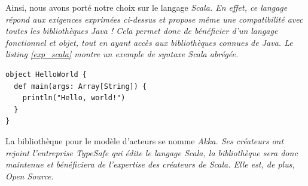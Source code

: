 Ainsi, nous avons porté notre choix sur le langage \em{Scala}. En effet, ce langage répond aux exigences exprimées ci-dessus et propose même une compatibilité avec toutes les bibliothèques Java ! Cela permet donc de bénéficier d'un langage fonctionnel et objet, tout en ayant accès aux bibliothèques connues de Java. Le listing \ref{exp_scala} montre un exemple de syntaxe Scala abrégée.

\begin{lstlisting}[caption={Exemple de code Scala},label=exp_scala]
object HelloWorld {
  def main(args: Array[String]) {
    println("Hello, world!")
  }
}
\end{lstlisting}

La bibliothèque pour le modèle d'acteurs se nomme \em{Akka}. Ses créateurs ont rejoint l'entreprise TypeSafe qui édite le langage Scala, la bibliothèque sera donc maintenue et bénéficiera de l'expertise des créateurs de Scala. Elle est, de plus, Open Source.